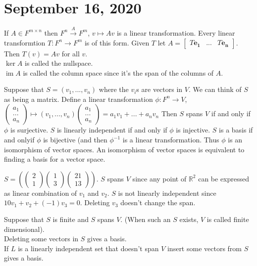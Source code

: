 \documentclass{article}
\newcommand{\R}{\mathbb{R}}
\newcommand{\ra}[1][]{\xrightarrow{#1}}
\DeclareMathOperator{\im}{im}
\begin{document}
\section{September 16, 2020}
\begin{example}
If $A\in F^{m\times n}$ then $F^n\ra[A]F^m$, $v\mapsto Av$ is a linear transformation. Every linear transformtion $T:F^n\ra F^m$ is of this form. Given $T$ let $A=
\begin{bmatrix}
T\mathbf{e_1} & ... & T\mathbf{e_n}
\end{bmatrix}$.
Then $T(v)=Av$ for all $v$.\\
$\ker A$ is called the nullspace.\\
$\im A$ is called the column space since it's the span of the columns of $A$.
\end{example}
Suppose that $S=(v_1,...,v_n)$ where the $v_i$s are vectors in $V$. We can think of $S$ as being a matrix. Define a linear transformation $\phi:F^n\ra V$,
$\begin{pmatrix}
a_1\\
...\\
a_n
\end{pmatrix}\mapsto (v_1,...,v_n)
\begin{pmatrix}
a_1\\
...\\
a_n
\end{pmatrix}=a_1v_1+...+a_nv_n$
Then $S$ spans $V$ if and only if $\phi$ is surjective. $S$ is linearly independent if and only if $\phi$ is injective. $S$ is a basis if and onlyif $\phi$ is bijective (and then $\phi^{-1}$ is a linear transformation. Thus $\phi$ is an isomorphism of vector spaces. An isomorphism of vector spaces is equivalent to finding a basis for a vector space.
\begin{example}[$V=\R^2$]
$S=(
\begin{pmatrix}
2\\
1
\end{pmatrix}
\begin{pmatrix}
1\\
3
\end{pmatrix}
\begin{pmatrix}
21\\
13
\end{pmatrix})$. $S$ spans $V$ since any point of $\R^2$ can be expressed as linear combination of $v_1$ and $v_2$. $S$ is not linearly independent since $10v_1+v_2+(-1)v_3=0$. Deleting $v_3$ doesn't change the span.
\end{example}
\begin{proposition}
Suppose that $S$ is finite and $S$ spans $V$. (When such an $S$ exists, $V$ is called finite dimensional).\\
Deleting some vectors in $S$ gives a basis. \\
If $L$ is a linearly independent set that doesn't span $V$ insert some vectors from $S$ gives a basis.
\end{proposition}
\end{document}
